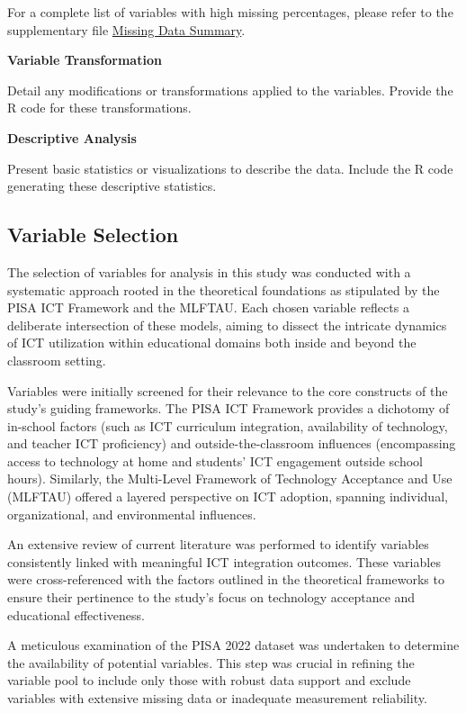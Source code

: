 \documentclass[
]{article}
\begin{document}
For a complete list of variables with high missing percentages, please
refer to the supplementary file
\href{data/metadata/missing_data_summary.csv}{Missing Data Summary}.

\textbf{Variable Transformation}

Detail any modifications or transformations applied to the variables.
Provide the R code for these transformations.

\textbf{Descriptive Analysis}

Present basic statistics or visualizations to describe the data. Include
the R code generating these descriptive statistics.

\hypertarget{variable-selection}{%
\subsection{Variable Selection}\label{variable-selection}}

The selection of variables for analysis in this study was conducted with
a systematic approach rooted in the theoretical foundations as
stipulated by the PISA ICT Framework and the MLFTAU. Each chosen
variable reflects a deliberate intersection of these models, aiming to
dissect the intricate dynamics of ICT utilization within educational
domains both inside and beyond the classroom setting.

Variables were initially screened for their relevance to the core
constructs of the study's guiding frameworks. The PISA ICT Framework
provides a dichotomy of in-school factors (such as ICT curriculum
integration, availability of technology, and teacher ICT proficiency)
and outside-the-classroom influences (encompassing access to technology
at home and students' ICT engagement outside school hours). Similarly,
the Multi-Level Framework of Technology Acceptance and Use (MLFTAU)
offered a layered perspective on ICT adoption, spanning individual,
organizational, and environmental influences.

An extensive review of current literature was performed to identify
variables consistently linked with meaningful ICT integration outcomes.
These variables were cross-referenced with the factors outlined in the
theoretical frameworks to ensure their pertinence to the study's focus
on technology acceptance and educational effectiveness.

A meticulous examination of the PISA 2022 dataset was undertaken to
determine the availability of potential variables. This step was crucial
in refining the variable pool to include only those with robust data
support and exclude variables with extensive missing data or inadequate
measurement reliability.
\end{document}
